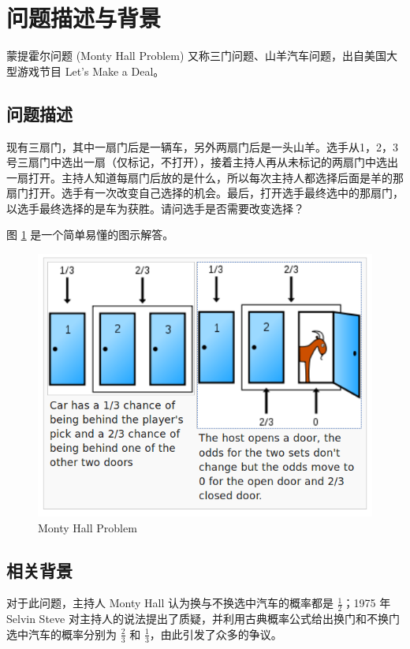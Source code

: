 \section{问题描述与背景}

蒙提霍尔问题\cite{selvin1975problem} (Monty Hall Problem) 又称三门问题、山羊汽车问题，出自美国大型游戏节目 Let's Make a Deal。

\subsection{问题描述}


现有三扇门，其中一扇门后是一辆车，另外两扇门后是一头山羊。选手从1，2，3号三扇门中选出一扇（仅标记，不打开），接着主持人再从未标记的两扇门中选出一扇打开。主持人知道每扇门后放的是什么，所以每次主持人都选择后面是羊的那扇门打开。选手有一次改变自己选择的机会。最后，打开选手最终选中的那扇门，以选手最终选择的是车为获胜。请问选手是否需要改变选择？

图 \ref{fig:Monty Hall Problem} 是一个简单易懂的图示解答。

\begin{figure}[H]
	\centering
	\includegraphics[width=12cm]{figure/figure1.png}
	\caption{Monty Hall Problem} \label{fig:Monty Hall Problem}
\end{figure}

\subsection{相关背景}

对于此问题，主持人 Monty Hall 认为换与不换选中汽车的概率都是 $\frac{1}{2}$；1975 年 Selvin Steve 对主持人的说法提出了质疑，并利用古典概率公式给出换门和不换门选中汽车的概率分别为 $\frac{2}{3}$ 和 $\frac{1}{3}$，由此引发了众多的争议。

